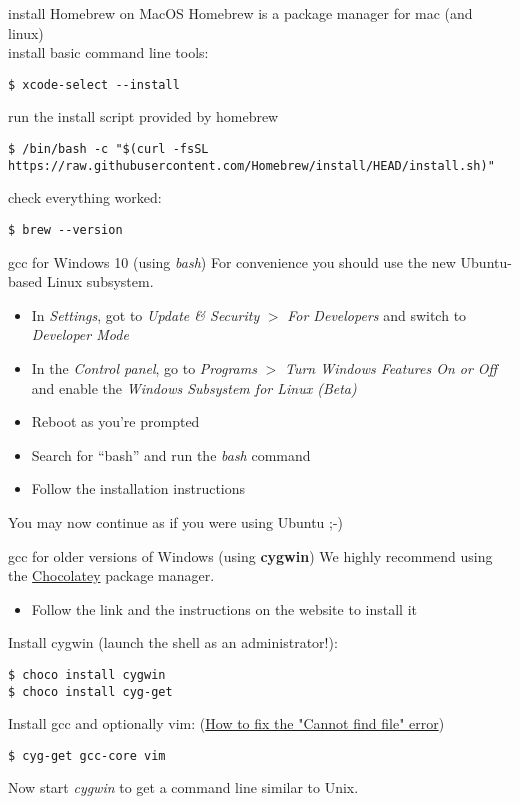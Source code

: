 \begin{frame}[fragile]{install Homebrew on MacOS}
	Homebrew is a package manager for mac (and linux)\\
	\bigskip
	install basic command line tools:
	\begin{lstlisting}[numbers=none]
$ xcode-select --install
\end{lstlisting}
	run the install script provided by homebrew
	\begin{lstlisting}[numbers=none]
$ /bin/bash -c "$(curl -fsSL https://raw.githubusercontent.com/Homebrew/install/HEAD/install.sh)"
\end{lstlisting}
	check everything worked:
	\begin{lstlisting}[numbers=none]
$ brew --version
\end{lstlisting}
\end{frame}

\begin{frame}{gcc for Windows 10 (using \textit{bash})}
	For convenience you should use the new Ubuntu-based Linux subsystem.\\
	\bigskip
	\begin{itemize}
		\item In \textit{Settings}, got to \textit{Update \& Security} $>$ \textit{For Developers}
			and switch to \textit{Developer Mode}
		\item In the \textit{Control panel}, go to \textit{Programs} $>$ \textit{Turn Windows Features On or Off}
			and enable the \textit{Windows Subsystem for Linux (Beta)}
		\item Reboot as you're prompted
		\item Search for ``bash'' and run the \textit{bash} command
		\item Follow the installation instructions
	\end{itemize}
	\bigskip
	You may now continue as if you were using Ubuntu ;-)
\end{frame}

\begin{frame}[fragile]{gcc for older versions of Windows (using \textbf{cygwin})}
	We highly recommend using the \href{https://chocolatey.org/}{Chocolatey} package manager.\\
	\begin{itemize}
		\item Follow the link and the instructions on the website to install it
	\end{itemize}
	\bigskip
	Install cygwin (launch the shell as an administrator!):
	\begin{lstlisting}[numbers=none]
$ choco install cygwin
$ choco install cyg-get
\end{lstlisting}
	\bigskip
	Install gcc and optionally vim: {\scriptsize(\href{https://github.com/chocolatey/chocolatey-coreteampackages/issues/176#issuecomment-212939458}{How to fix the "Cannot find file" error})}
	\begin{lstlisting}[numbers=none]
$ cyg-get gcc-core vim
\end{lstlisting}
	\bigskip
	Now start \textit{cygwin} to get a command line similar to Unix.
\end{frame}

